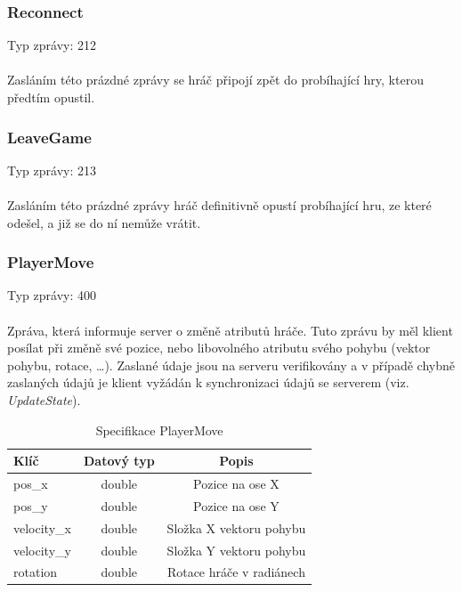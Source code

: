 \documentclass[12pt, a4paper]{article}
\begin{document}
    \subsubsection*{Reconnect}
    Typ zprávy: 212\\\\
    Zasláním této prázdné zprávy se hráč připojí zpět do probíhající hry, kterou předtím opustil.

    \subsubsection*{LeaveGame}
    Typ zprávy: 213\\\\
    Zasláním této prázdné zprávy hráč definitivně opustí probíhající hru, ze které odešel, a již se do ní nemůže vrátit.
   
    \subsubsection*{PlayerMove}
    Typ zprávy: 400\\\\
    Zpráva, která informuje server o změně atributů hráče.
    Tuto zprávu by měl klient posílat při změně své pozice, nebo libovolného atributu svého pohybu (vektor pohybu, rotace, \dots).
    Zaslané údaje jsou na serveru verifikovány a v případě chybně zaslaných údajů je klient vyžádán k synchronizaci údajů se serverem (viz. \textit{UpdateState}).

    \begin{table}[H]
        \centering
        \begin{tabular}{|l|c|c|}
            \hline
            Klíč & Datový typ & Popis\\
            \hline
            \hline
            pos\_x & double & Pozice na ose X\\
            \hline
            pos\_y & double & Pozice na ose Y\\
            \hline
            velocity\_x & double & Složka X vektoru pohybu\\
            \hline
            velocity\_y & double & Složka Y vektoru pohybu\\
            \hline
            rotation & double & Rotace hráče v radiánech\\
            \hline
        \end{tabular}
        \caption{Specifikace PlayerMove}
    \end{table}
\end{document}
